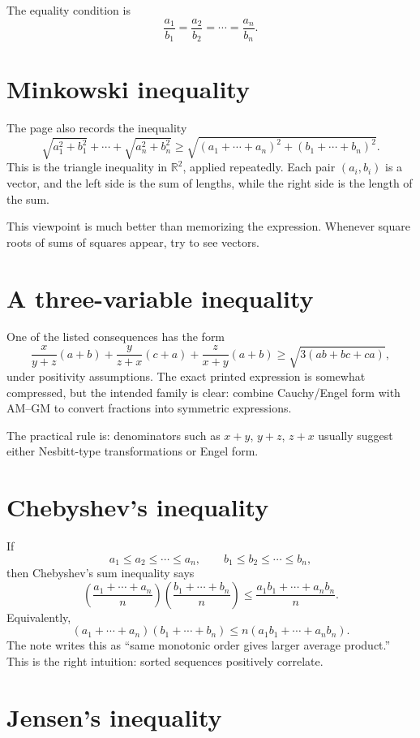 The equality condition is
\[
  \frac{a_1}{b_1}=\frac{a_2}{b_2}=\cdots=\frac{a_n}{b_n}.
\]

\section{Minkowski inequality}

The page also records the inequality
\[
  \sqrt{a_1^2+b_1^2}+\cdots+\sqrt{a_n^2+b_n^2}
  \ge
  \sqrt{(a_1+\cdots+a_n)^2+(b_1+\cdots+b_n)^2}.
\]
This is the triangle inequality in \(\mathbb R^2\), applied repeatedly.  Each pair \((a_i,b_i)\) is a vector, and the left side is the sum of lengths, while the right side is the length of the sum.

This viewpoint is much better than memorizing the expression.  Whenever square roots of sums of squares appear, try to see vectors.

\section{A three-variable inequality}

One of the listed consequences has the form
\[
  \frac{x}{y+z}(a+b)+\frac{y}{z+x}(c+a)+\frac{z}{x+y}(a+b)
  \ge \sqrt{3(ab+bc+ca)},
\]
under positivity assumptions.  The exact printed expression is somewhat compressed, but the intended family is clear: combine Cauchy/Engel form with AM--GM to convert fractions into symmetric expressions.

The practical rule is: denominators such as \(x+y\), \(y+z\), \(z+x\) usually suggest either Nesbitt-type transformations or Engel form.

\section{Chebyshev's inequality}

If
\[
  a_1\le a_2\le\cdots\le a_n,\qquad
  b_1\le b_2\le\cdots\le b_n,
\]
then Chebyshev's sum inequality says
\[
  \left(\frac{a_1+\cdots+a_n}{n}\right)
  \left(\frac{b_1+\cdots+b_n}{n}\right)
  \le
  \frac{a_1b_1+\cdots+a_nb_n}{n}.
\]
Equivalently,
\[
  (a_1+\cdots+a_n)(b_1+\cdots+b_n)
  \le n(a_1b_1+\cdots+a_nb_n).
\]
The note writes this as ``same monotonic order gives larger average product.''  This is the right intuition: sorted sequences positively correlate.

\section{Jensen's inequality}

